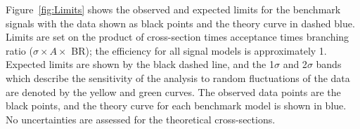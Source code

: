 Figure~\ref{fig:Limits} shows the observed and expected limits for the benchmark signals with the data shown as black points and the theory curve in dashed blue.  Limits are set on the product of cross-section times acceptance times branching ratio ($\sigma \times A \times$ BR); the efficiency for all signal models is approximately 1.  Expected limits are shown by the black dashed line, and the 1$\sigma$ and 2$\sigma$ bands which describe the sensitivity of the analysis to random fluctuations of the data are denoted by the yellow and green curves.  The observed data points are the black points, and the theory curve for each benchmark model is shown in blue.  No uncertainties are assessed for the theoretical cross-sections.

\begin{figure}[ht!]
	\centering
	\hspace{0.1\columnwidth}%
	\hspace{0.1\columnwidth}%

\end{figure}
